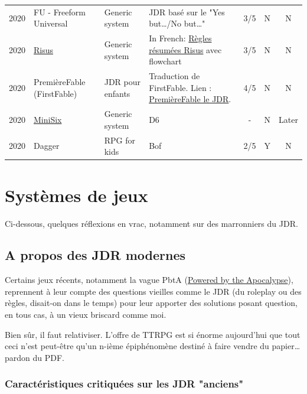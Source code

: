 \documentclass[a4paper, 11pt, twoside]{article}
\begin{document}
\begin{longtable}{cp{2cm}p{1.5cm}p{7cm}ccc}
2020 & FU - Freeform Universal & Generic system & JDR basé sur le "Yes but\ldots{}/No but\ldots{}" & 3/5 & N & N\\
2020 & \href{https://github.com/orey/jdr/tree/master/Risus-fr}{Risus} & Generic system & In French:  \href{https://github.com/orey/jdr/tree/master/Risus-fr}{Règles résumées Risus} avec flowchart & 3/5 & N & N\\
2020 & PremièreFable (FirstFable) & JDR pour enfants & Traduction de FirstFable. Lien : \href{https://orey.github.io/premierefable/}{PremièreFable le JDR}. & 4/5 & N & N\\
2020 & \href{https://www.drivethrurpg.com/product/144558/Mini-Six-Bare-Bones-Edition}{MiniSix} & Generic system & D6 & - & N & Later\\
2020 & Dagger & RPG for kids & Bof & 2/5 & Y & N\\
\end{longtable}

\section{Systèmes de jeux}
\label{sec:org193ed9e}

Ci-dessous, quelques réflexions en vrac, notamment sur des marronniers du JDR.

\subsection{A propos des JDR modernes}
\label{sec:org645793c}

Certains jeux récents, notamment la vague PbtA (\href{https://en.wikipedia.org/wiki/Powered\_by\_the\_Apocalypse}{Powered by the Apocalypse}), reprennent à leur compte des questions vieilles comme le JDR (du roleplay ou des règles, disait-on dans le temps) pour leur apporter des solutions posant question, en tous cas, à un vieux briscard comme moi.

Bien sûr, il faut relativiser. L'offre de TTRPG est si énorme aujourd'hui que tout ceci n'est peut-être qu'un n-ième épiphénomène destiné à faire vendre du papier\ldots{} pardon du PDF.

\subsubsection{Caractéristiques critiquées sur les JDR "anciens"}
\label{sec:org00154b7}
\end{document}

